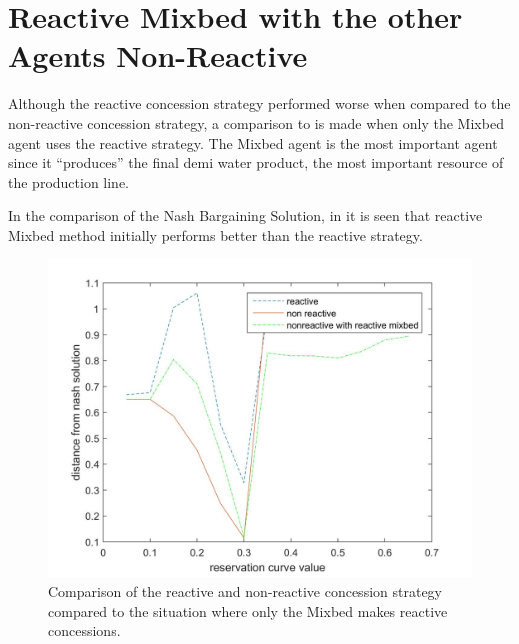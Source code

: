 \section{Reactive Mixbed with the other Agents Non-Reactive }
Although the reactive concession strategy performed worse when compared to the non-reactive concession strategy, a comparison to is made when only the Mixbed agent uses the reactive strategy. The Mixbed agent is the most important agent since it ``produces'' the final demi water product, the most important resource of the production line.

In the comparison of the Nash Bargaining Solution, in  it is seen that reactive Mixbed  method initially performs better than the reactive strategy. 

\begin{figure}[h]
	\centering
	\includegraphics[width=0.9\linewidth]{img/reactivevsnonreactivevsMixbedrea}
	\caption{Comparison of the reactive and non-reactive concession strategy compared to the situation where only the Mixbed makes reactive concessions.}
	\label{fig:reactivevsnon-reactivevsnon-reactivemxbrea}
\end{figure}


